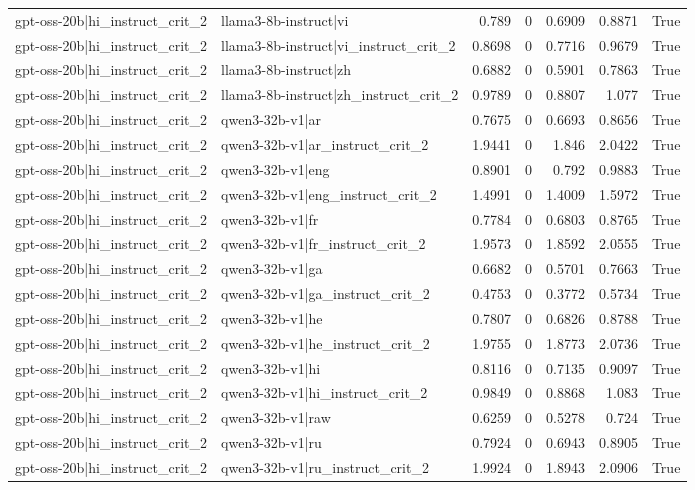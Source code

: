 \begin{table}
\begin{tabular}{l l r r r r l}
gpt-oss-20b|hi_instruct_crit_2 & llama3-8b-instruct|vi & 0.789 & 0 & 0.6909 & 0.8871 & True \\
gpt-oss-20b|hi_instruct_crit_2 & llama3-8b-instruct|vi_instruct_crit_2 & 0.8698 & 0 & 0.7716 & 0.9679 & True \\
gpt-oss-20b|hi_instruct_crit_2 & llama3-8b-instruct|zh & 0.6882 & 0 & 0.5901 & 0.7863 & True \\
gpt-oss-20b|hi_instruct_crit_2 & llama3-8b-instruct|zh_instruct_crit_2 & 0.9789 & 0 & 0.8807 & 1.077 & True \\
gpt-oss-20b|hi_instruct_crit_2 & qwen3-32b-v1|ar & 0.7675 & 0 & 0.6693 & 0.8656 & True \\
gpt-oss-20b|hi_instruct_crit_2 & qwen3-32b-v1|ar_instruct_crit_2 & 1.9441 & 0 & 1.846 & 2.0422 & True \\
gpt-oss-20b|hi_instruct_crit_2 & qwen3-32b-v1|eng & 0.8901 & 0 & 0.792 & 0.9883 & True \\
gpt-oss-20b|hi_instruct_crit_2 & qwen3-32b-v1|eng_instruct_crit_2 & 1.4991 & 0 & 1.4009 & 1.5972 & True \\
gpt-oss-20b|hi_instruct_crit_2 & qwen3-32b-v1|fr & 0.7784 & 0 & 0.6803 & 0.8765 & True \\
gpt-oss-20b|hi_instruct_crit_2 & qwen3-32b-v1|fr_instruct_crit_2 & 1.9573 & 0 & 1.8592 & 2.0555 & True \\
gpt-oss-20b|hi_instruct_crit_2 & qwen3-32b-v1|ga & 0.6682 & 0 & 0.5701 & 0.7663 & True \\
gpt-oss-20b|hi_instruct_crit_2 & qwen3-32b-v1|ga_instruct_crit_2 & 0.4753 & 0 & 0.3772 & 0.5734 & True \\
gpt-oss-20b|hi_instruct_crit_2 & qwen3-32b-v1|he & 0.7807 & 0 & 0.6826 & 0.8788 & True \\
gpt-oss-20b|hi_instruct_crit_2 & qwen3-32b-v1|he_instruct_crit_2 & 1.9755 & 0 & 1.8773 & 2.0736 & True \\
gpt-oss-20b|hi_instruct_crit_2 & qwen3-32b-v1|hi & 0.8116 & 0 & 0.7135 & 0.9097 & True \\
gpt-oss-20b|hi_instruct_crit_2 & qwen3-32b-v1|hi_instruct_crit_2 & 0.9849 & 0 & 0.8868 & 1.083 & True \\
gpt-oss-20b|hi_instruct_crit_2 & qwen3-32b-v1|raw & 0.6259 & 0 & 0.5278 & 0.724 & True \\
gpt-oss-20b|hi_instruct_crit_2 & qwen3-32b-v1|ru & 0.7924 & 0 & 0.6943 & 0.8905 & True \\
gpt-oss-20b|hi_instruct_crit_2 & qwen3-32b-v1|ru_instruct_crit_2 & 1.9924 & 0 & 1.8943 & 2.0906 & True \\

\end{tabular}
\end{table}
